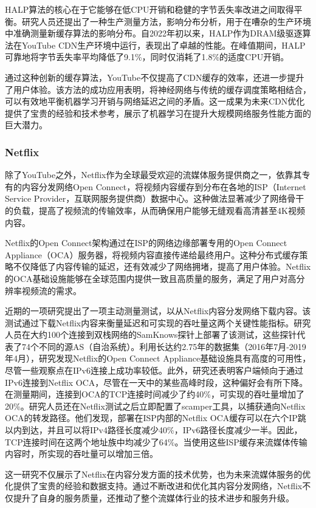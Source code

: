 HALP算法的核心在于它能够在低CPU开销和稳健的字节丢失率改进之间取得平衡。研究人员还提出了一种生产测量方法，影响分布分析，用于在嘈杂的生产环境中准确测量新缓存算法的影响分布。自2022年初以来，HALP作为DRAM级驱逐算法在YouTube CDN生产环境中运行，表现出了卓越的性能。在峰值期间，HALP可靠地将字节丢失率平均降低了9.1\%，同时仅消耗了1.8\%的适度CPU开销。

通过这种创新的缓存算法，YouTube不仅提高了CDN缓存的效率，还进一步提升了用户体验。该方法的成功应用表明，将神经网络与传统的缓存调度策略相结合，可以有效地平衡机器学习开销与网络延迟之间的矛盾。这一成果为未来CDN优化提供了宝贵的经验和技术参考，展示了机器学习在提升大规模网络服务性能方面的巨大潜力。

\subsubsection{Netflix}

除了YouTube之外，Netflix作为全球最受欢迎的流媒体服务提供商之一，依靠其专有的内容分发网络Open Connect\cite{NetflixO4:online}，将视频内容缓存到分布在各地的ISP（Internet Service Provider，互联网服务提供商）数据中心。这种做法显著减少了网络骨干的负载，提高了视频流的传输效率，从而确保用户能够无缝观看高清甚至4K视频内容。

Netflix的Open Connect架构通过在ISP的网络边缘部署专用的Open Connect Appliance（OCA）服务器，将视频内容直接传递给最终用户。这种分布式缓存策略不仅降低了内容传输的延迟，还有效减少了网络拥堵，提高了用户体验。Netflix的OCA基础设施能够在全球范围内提供一致且高质量的服务，满足了用户对高分辨率视频流的需求。

近期的一项研究\cite{doan2020longitudinal}提出了一项主动测量测试，以从Netflix内容分发网络下载内容。该测试通过下载Netflix内容来衡量延迟和可实现的吞吐量这两个关键性能指标。研究人员在大约100个连接到双栈网络的SamKnows探针上部署了该测试，这些探针代表了74个不同的源AS（自治系统）。利用长达约2.75年的数据集（2016年7月-2019年4月），研究发现Netflix的Open Connect Appliance基础设施具有高度的可用性，尽管一些观察点在IPv6连接上成功率较低。此外，研究还表明客户端倾向于通过IPv6连接到Netflix OCA，尽管在一天中的某些高峰时段，这种偏好会有所下降。在测量期间，连接到OCA的TCP连接时间减少了约40\%，可实现的吞吐量增加了20\%。研究人员还在Netflix测试之后立即配置了scamper工具，以捕获通向Netflix OCA的转发路径。他们发现，部署在ISP内部的Netflix OCA缓存可以在六个IP跳以内到达，并且可以将IPv4路径长度减少40\%，IPv6路径长度减少一半。因此，TCP连接时间在这两个地址族中均减少了64\%。当使用这些ISP缓存来流媒体传输内容时，所实现的吞吐量可以增加三倍。

这一研究不仅展示了Netflix在内容分发方面的技术优势，也为未来流媒体服务的优化提供了宝贵的经验和数据支持。通过不断改进和优化其内容分发网络，Netflix不仅提升了自身的服务质量，还推动了整个流媒体行业的技术进步和服务升级。


